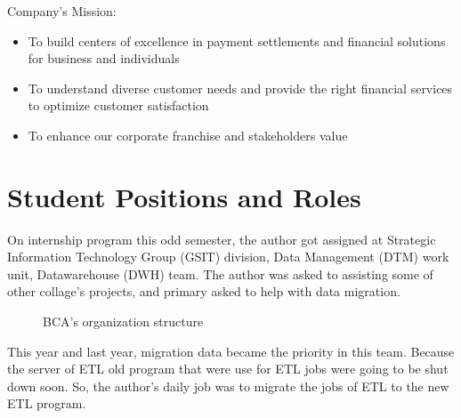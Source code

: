 Company's Mission:
\begin{itemize}
	\itemsep0em
    \item To build centers of excellence in payment settlements and financial solutions for business and individuals
    \item To understand diverse customer needs and provide the right financial services to optimize customer satisfaction
    \item To enhance our corporate franchise and stakeholders value
\end{itemize}

\section{Student Positions and Roles}
On internship program this odd semester, the author got assigned at Strategic Information Technology Group (GSIT) division, Data Management (DTM) work unit, Datawarehouse (DWH) team. The author was asked to assisting some of other collage's projects, and primary asked to help with data migration.

\begin{figure}[H]
\centering
{}
\caption{BCA's organization structure}
\end{figure}

This year and last year, migration data became the priority in this team. Because the server of ETL old program that were use for ETL jobs were going to be shut down soon. So, the author's daily job was to migrate the jobs of ETL to the new ETL program.

